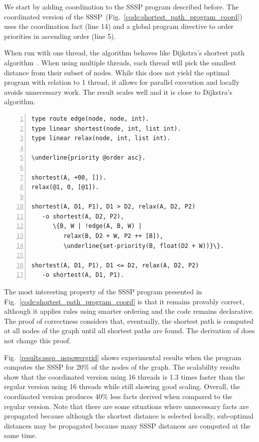 We start by adding coordination to the SSSP program described before.
The coordinated version of the
SSSP~(Fig.~\ref{code:shortest_path_program_coord}) uses the coordination fact
 (line 14) and a global program directive to order
priorities in ascending order (line 5).

When run with one thread, the algorithm behaves like
Dijkstra's shortest path algorithm~\cite{Dijkstra}. When using multiple
threads, each thread will pick the smallest distance from their subset of nodes.
While this does not yield the optimal program with relation to 1 thread, it
allows for parallel execution and locally avoids unnecessary work. The result
scales well and it is close to Dijkstra's algorithm.

\begin{topfig}
\scriptsize\begin{Verbatim}[numbers=left,commandchars=\\\{\}]
type route edge(node, node, int).
type linear shortest(node, int, list int).
type linear relax(node, int, list int).

\underline{priority @order asc}.

shortest(A, +00, []).
relax(@1, 0, [@1]).

shortest(A, D1, P1), D1 > D2, relax(A, D2, P2)
   -o shortest(A, D2, P2),
      \{B, W | !edge(A, B, W) |
         relax(B, D2 + W, P2 ++ [B]),
         \underline{set-priority(B, float(D2 + W))}\}.

shortest(A, D1, P1), D1 <= D2, relax(A, D2, P2)
   -o shortest(A, D1, P1).
\end{Verbatim}
\end{topfig}
\normalsize

The most interesting property of the SSSP program presented in
Fig.~\ref{code:shortest_path_program_coord} is that it remains provably correct,
although it applies rules using smarter ordering and the code remains
declarative. The proof of correctness considers that, eventually, the shortest
path is computed at all nodes of the graph until all shortest paths are found.
The derivation of  does not change this
proof.

Fig.~\ref{results:sssp_uspowergrid} shows experimental results when the
program computes the SSSP for 20\% of the nodes of the graph.
The scalability results show that the coordinated
version using 16 threads is 1.3 times faster than the regular version using 16
threads while still showing good scaling. Overall, the coordinated version produces 40\% less facts
derived when compared to the regular version.
Note that there are some situations where unnecessary facts are propagated
because although the shortest distance is selected locally, sub-optimal distances may be
propagated because many SSSP distances are computed at the same time.

